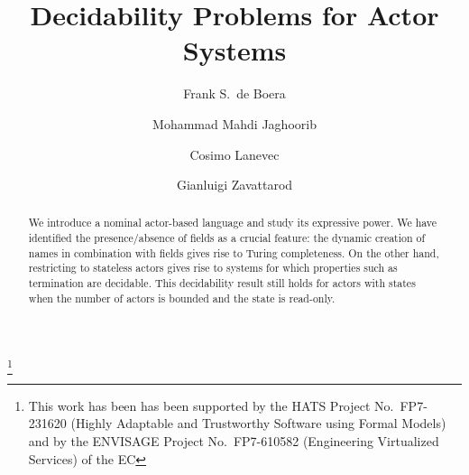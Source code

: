 \documentclass{LMCS}
\theoremstyle{plain}\newtheorem{proposition}[thm]{Proposition}
\theoremstyle{plain}\newtheorem{lemma}[thm]{Lemma}
\theoremstyle{plain}\newtheorem{theorem}[thm]{Theorem}
\theoremstyle{plain}\newtheorem{corollary}[thm]{Corollary}
\begin{document}
\title[Decidability Problems for Actor Systems]
      {Decidability Problems for Actor Systems\rsuper*}

\author[F.~S.~de Boer]{Frank S.~de Boer\rsuper a}
\address{{\lsuper a}CWI/LIACS,  The Netherlands}
\thanks{{}This work has been has been supported by the HATS Project No.~FP7-231620 
(Highly Adaptable and Trustworthy Software using Formal Models) and by the
ENVISAGE Project No.~FP7-610582 (Engineering Virtualized Services) of the EC}

\author[M.~M.~Jaghoori]{Mohammad Mahdi Jaghoori\rsuper b}
\address{{\lsuper b}Leiden University, The Netherlands}



\author[C.~Laneve]{Cosimo Laneve\rsuper c}
\address{{}Department of Computer Science and Engineering, University of Bologna, INRIA Focus, Italy}


\author[G.~Zavattaro]{Gianluigi Zavattaro\rsuper d}




\begin{abstract}
We introduce a nominal actor-based language and study its expressive power.
We have identified the presence/absence of fields as a crucial feature:
the dynamic creation of  names
in combination with fields gives rise to Turing completeness.
On the other hand, restricting  to stateless actors 
gives rise to systems  for which properties such as termination are decidable.
This decidability result still holds for actors with states when
the number of actors is bounded and the state is read-only.





\end{abstract}


\maketitle              
\end{document}
